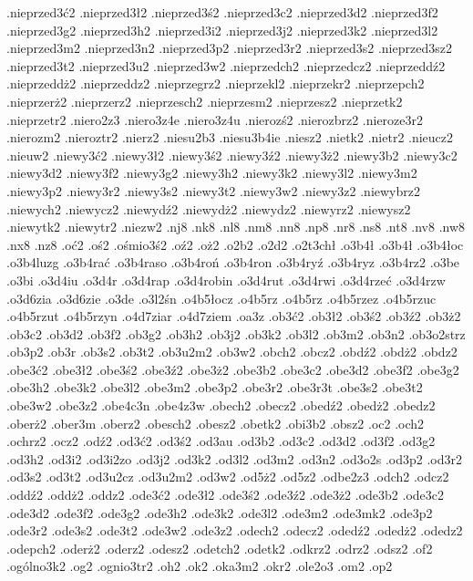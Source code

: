 {.nieprzed3\'c2
.nieprzed3\l 2
.nieprzed3\'s2
.nieprzed3c2
.nieprzed3d2
.nieprzed3f2
.nieprzed3g2
.nieprzed3h2
.nieprzed3i2
.nieprzed3j2
.nieprzed3k2
.nieprzed3l2
.nieprzed3m2
.nieprzed3n2
.nieprzed3p2
.nieprzed3r2
.nieprzed3s2
.nieprzed3sz2
.nieprzed3t2
.nieprzed3u2
.nieprzed3w2
.nieprzedch2
.nieprzedcz2
.nieprzedd\'z2
.nieprzedd\.z2
.nieprzeddz2
.nieprzegrz2
.nieprzekl2
.nieprzekr2
.nieprzepch2
.nieprzer\.z2
.nieprzerz2
.nieprzesch2
.nieprzesm2
.nieprzesz2
.nieprzetk2
.nieprzetr2
.niero2z3
.niero3z4e
.niero3z4u
.nieroz\'s2
.nierozbrz2
.nieroze3r2
.nierozm2
.nieroztr2
.nierz2
.niesu2b3
.niesu3b4ie
.niesz2
.nietk2
.nietr2
.nieucz2
.nieuw2
.niewy3\'c2
.niewy3\l 2
.niewy3\'s2
.niewy3\'z2
.niewy3\.z2
.niewy3b2
.niewy3c2
.niewy3d2
.niewy3f2
.niewy3g2
.niewy3h2
.niewy3k2
.niewy3l2
.niewy3m2
.niewy3p2
.niewy3r2
.niewy3s2
.niewy3t2
.niewy3w2
.niewy3z2
.niewybrz2
.niewych2
.niewycz2
.niewyd\'z2
.niewyd\.z2
.niewydz2
.niewyrz2
.niewysz2
.niewytk2
.niewytr2
.niezw2
.nj8
.nk8
.nl8
.nm8
.nn8
.np8
.nr8
.ns8
.nt8
.nv8
.nw8
.nx8
.nz8
.o\'c2
.o\'s2
.o\'smio3\'s2
.o\'z2
.o\.z2
.o2b2
.o2d2
.o2t3ch\l 
.o3b4\l \ka
.o3b4\l \ke
.o3b4\l oc
.o3b4luzg
.o3b4ra\'c
.o3b4raso
.o3b4ro\'n
.o3b4ron
.o3b4ry\'z
.o3b4ryz
.o3b4rz2
.o3be
.o3bi
.o3d4iu
.o3d4r\ket
.o3d4rap
.o3d4robin
.o3d4rut
.o3d4rwi
.o3d4rze\'c
.o3d4rzw
.o3d6zia
.o3d6zie
.o3de
.o3l2\'sn
.o4b5\l ocz
.o4b5rz\ka
.o4b5rz\ked
.o4b5rzez
.o4b5rzuc
.o4b5rzut
.o4b5rzyn
.o4d7ziar
.o4d7ziem
.oa3z
.ob3\'c2
.ob3\l 2
.ob3\'s2
.ob3\'z2
.ob3\.z2
.ob3c2
.ob3d2
.ob3f2
.ob3g2
.ob3h2
.ob3j2
.ob3k2
.ob3l2
.ob3m2
.ob3n2
.ob3o2strz
.ob3p2
.ob3r
.ob3s2
.ob3t2
.ob3u2m2
.ob3w2
.obch2
.obcz2
.obd\'z2
.obd\.z2
.obdz2
.obe3\'c2
.obe3\l 2
.obe3\'s2
.obe3\'z2
.obe3\.z2
.obe3b2
.obe3c2
.obe3d2
.obe3f2
.obe3g2
.obe3h2
.obe3k2
.obe3l2
.obe3m2
.obe3p2
.obe3r2
.obe3r3t
.obe3s2
.obe3t2
.obe3w2
.obe3z2
.obe4c3n
.obe4z3w
.obech2
.obecz2
.obed\'z2
.obed\.z2
.obedz2
.ober\.z2
.ober3m
.oberz2
.obesch2
.obesz2
.obetk2
.obi3b2
.obsz2
.oc2
.och2
.ochrz2
.ocz2
.od\'z2
.od3\'c2
.od3\'s2
.od3au
.od3b2
.od3c2
.od3d2
.od3f2
.od3g2
.od3h2
.od3i2
.od3i2zo
.od3j2
.od3k2
.od3l2
.od3m2
.od3n2
.od3o2s
.od3p2
.od3r2
.od3s2
.od3t2
.od3u2cz
.od3u2m2
.od3w2
.od5\.z2
.od5z2
.odbe2z3
.odch2
.odcz2
.odd\'z2
.odd\.z2
.oddz2
.ode3\'c2
.ode3\l 2
.ode3\'s2
.ode3\'z2
.ode3\.z2
.ode3b2
.ode3c2
.ode3d2
.ode3f2
.ode3g2
.ode3h2
.ode3k2
.ode3l2
.ode3m2
.ode3mk2
.ode3p2
.ode3r2
.ode3s2
.ode3t2
.ode3w2
.ode3z2
.odech2
.odecz2
.oded\'z2
.oded\.z2
.odedz2
.odepch2
.oder\.z2
.oderz2
.odesz2
.odetch2
.odetk2
.odkrz2
.odrz2
.odsz2
.of2
.og\'olno3k2
.og2
.ognio3tr2
.oh2
.ok2
.oka3m2
.okr2
.ole2o3
.om2
.op2
}
